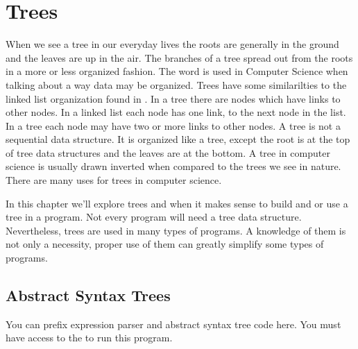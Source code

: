 \documentclass[letterpaper,10pt,english]{sphinxmanual}
\begin{document}
\chapter{Trees}
\label{\detokenize{chap6/chap6:trees}}\label{\detokenize{chap6/chap6:chap6}}\label{\detokenize{chap6/chap6::doc}}
When we see a tree in our everyday lives the roots are generally in the ground and the leaves are up in the air. The branches of a tree spread out from the roots in a more or less organized fashion. The word  is used in Computer Science when talking about a way data may be organized. Trees have some similarilties to the linked list organization found in {\hyperref[\detokenize{chap4/chap4:chap4}]{}}. In a tree there are nodes which have links to other nodes. In a linked list each node has one link, to the next node in the list. In a tree each node may have two or more links to other nodes. A tree is not a sequential data structure. It is organized like a tree, except the root is at the top of tree data structures and the leaves are at the bottom. A tree in computer science is usually drawn inverted when compared to the trees we see in nature. There are many uses for trees in computer science.

In this chapter we’ll explore trees and when it makes sense to build and or use a tree in a program. Not every program will need a tree data structure. Nevertheless, trees are used in many types of programs. A knowledge of them is not only a necessity, proper use of them can greatly simplify some types of programs.


\section{Abstract Syntax Trees}
\label{\detokenize{chap6/chap6:abstract-syntax-trees}}
You can  prefix expression parser and abstract syntax tree code here. You must have access to the {\hyperref[\detokenize{chap4/chap4:queuecode}]{}} to run this program.
\end{document}
